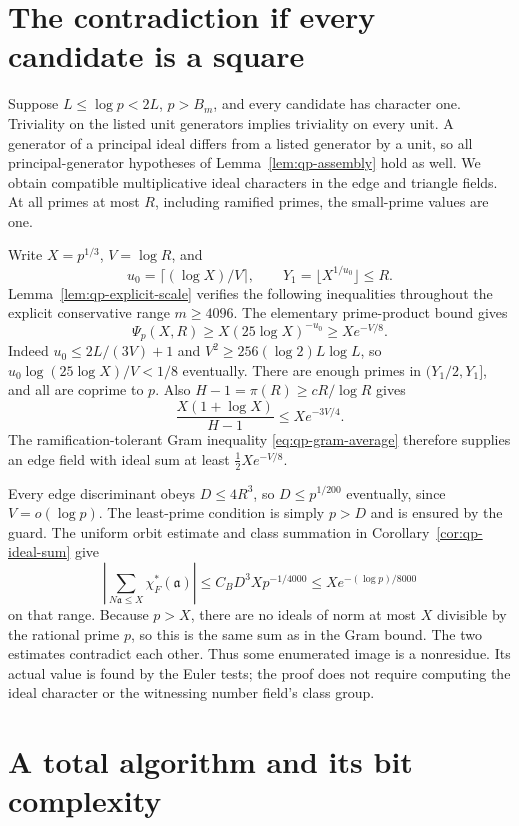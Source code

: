 \section{The contradiction if every candidate is a square}
\label{sec:qnr-proof}

Suppose $L\leq\log p<2L$, $p>B_m$, and every candidate has
character one.  Triviality on the listed unit generators implies
triviality on every unit.  A generator of a principal ideal differs
from a listed generator by a unit, so all principal-generator
hypotheses of Lemma~\ref{lem:qp-assembly} hold as well.
We obtain compatible multiplicative ideal characters in the edge and
triangle fields.  At all primes at most $R$, including ramified primes,
the small-prime values are one.

Write $X=p^{1/3}$, $V=\log R$, and
\[
 u_0=\lceil(\log X)/V\rceil,
 \qquad Y_1=\lfloor X^{1/u_0}\rfloor\leq R.
\]
Lemma~\ref{lem:qp-explicit-scale} verifies the following inequalities
throughout the explicit conservative range $m\geq4096$.
The elementary prime-product bound gives
\begin{equation}
 \Psi_p(X,R)\geq X(25\log X)^{-u_0}\geq Xe^{-V/8}.
 \label{eq:qnr-smooth}
\end{equation}
Indeed $u_0\leq2L/(3V)+1$ and
$V^2\geq256(\log2)L\log L$, so
$u_0\log(25\log X)/V<1/8$ eventually.
There are enough primes in $(Y_1/2,Y_1]$, and all are coprime to $p$.
Also $H-1=\pi(R)\geq cR/\log R$ gives
\[
 \frac{X(1+\log X)}{H-1}\leq Xe^{-3V/4}.
\]
The ramification-tolerant Gram inequality
\eqref{eq:qp-gram-average} therefore supplies an edge field with ideal
sum at least $\frac12Xe^{-V/8}$.

Every edge discriminant obeys $D\leq4R^3$, so
$D\leq p^{1/200}$ eventually, since $V=o(\log p)$.
The least-prime condition is simply $p>D$ and is ensured by the guard.
The uniform orbit estimate and class summation in
Corollary~\ref{cor:qp-ideal-sum} give
\[
 \left|\sum_{N\mathfrak a\leq X}\chi_F^*(\mathfrak a)\right|
 \leq C_BD^3Xp^{-1/4000}
 \leq Xe^{-(\log p)/8000}
\]
on that range.
Because $p>X$, there are no ideals of norm at most $X$ divisible by
the rational prime $p$, so this is the same sum as in the Gram bound.
The two estimates contradict each other.  Thus some enumerated image
is a nonresidue.  Its actual value is found by the Euler tests; the proof
does not require computing the ideal character or the witnessing
number field's class group.

\section{A total algorithm and its bit complexity}

